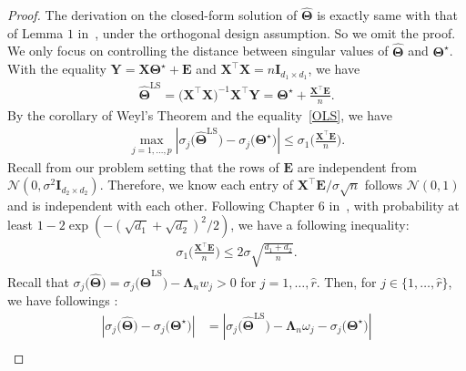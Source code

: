 \documentclass[12pt]{article}
\begin{document}
\begin{proof}
The derivation on the closed-form solution of $\widehat{\boldsymbol{\Theta}}$ is exactly same with that of Lemma $1$ in~\citep{yuan2007dimension}, under the orthogonal design assumption.
So we omit the proof. 
We only focus on controlling the distance between singular values of $\widehat{\boldsymbol{\Theta}}$ and $\boldsymbol{\Theta}^{\star}$. 
With the equality $\boldsymbol{Y}=\boldsymbol{X}\boldsymbol{\Theta}^{\star}+\boldsymbol{E}$ and $\boldsymbol{X}^{\top}\boldsymbol{X}=n\boldsymbol{I}_{d_{1} \times d_{1}}$, we have
\begin{align} \label{OLS}
    \widehat{\boldsymbol{\Theta}}^{\text{LS}}=\big(\boldsymbol{X}^{\top}\boldsymbol{X}\big)^{-1}\boldsymbol{X}^{\top}\boldsymbol{Y} = \boldsymbol{\Theta^\star} + \frac{\boldsymbol{X}^{\top}\boldsymbol{E}}{n}.
\end{align}
By the corollary of Weyl's Theorem and the equality~\eqref{OLS}, we have
\begin{align} \label{sing_ineq}
    \max_{j=1,\dots,p}\left| \sigma_{j}\big(\widehat{\boldsymbol{\Theta}}^{\text{LS}}\big) - \sigma_{j}\big(\boldsymbol{\Theta^\star}\big) \right|
    \leq \sigma_{1}\bigg( \frac{\boldsymbol{X}^{\top}\boldsymbol{E}}{n} \bigg).
\end{align}
Recall from our problem setting that the rows of $\boldsymbol{E}$ are independent from $\mathcal{N}(0,\sigma^{2}\boldsymbol{I}_{d_{2} \times d_{2}})$.
Therefore, we know each entry of $\boldsymbol{X}^{\top}\boldsymbol{E}/\sigma\sqrt{n}$ follows $\mathcal{N}(0,1)$ and is independent with each other.
Following Chapter $6$ in~\cite{wainwright2019high}, 
with probability at least $1-2\exp(-(\sqrt{d_{1}}+\sqrt{d_{2}})^{2}/2)$, we have a following inequality: 
\begin{align} \label{Singular_bnd}
    \sigma_{1}\bigg( \frac{\boldsymbol{X}^{\top}\boldsymbol{E}}{n} \bigg) \leq 2\sigma \sqrt{\frac{d_{1}+d_{2}}{n}} .
\end{align}
Recall that $\sigma_{j}\big(\widehat{\boldsymbol{\Theta}}\big) = \sigma_{j}\big(\widehat{\boldsymbol{\Theta}}^{\text{LS}}\big)-\boldsymbol{\Lambda}_{n} w_{j}>0$ for $j=1,\dots,\widehat{r}$.
Then, for $j\in\{1,\dots,\widehat{r}\}$, we have followings :
\begin{align}
    \left| \sigma_{j}\big(\widehat{\boldsymbol{\Theta}}\big)-\sigma_{j}\big(\boldsymbol{\Theta}^{\star}\big)\right|
    &= \left|\sigma_{j}\big(\widehat{\boldsymbol{\Theta}}^{\text{LS}}\big)-\boldsymbol{\Lambda}_{n}\omega_{j}
    -\sigma_{j}\big(\boldsymbol{\Theta}^{\star}\big)\right| \nonumber \\

\end{align}
\end{proof}
\end{document}
